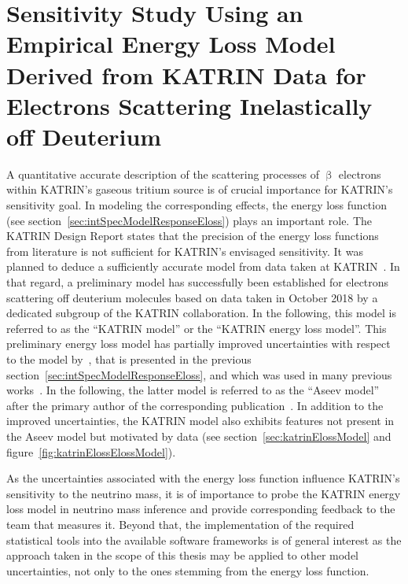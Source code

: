 \def\currentRootFolder{chapter/sensitivityStudyWithPreliminaryKatrinElossModel}
\def\currentFigureFolder{\currentRootFolder/fig}

\chapter{Sensitivity Study Using an Empirical Energy Loss Model Derived from KATRIN Data for Electrons Scattering Inelastically off Deuterium}
\label{sec:katrinEloss}
A quantitative accurate description of the scattering processes of $\upbeta$ electrons within KATRIN's gaseous tritium source is of crucial importance for KATRIN's sensitivity goal. In modeling the corresponding effects, the energy loss function (see section~\ref{sec:intSpecModelResponseEloss}) plays an important role. The KATRIN Design Report states that the precision of the energy loss functions from literature is not sufficient for KATRIN's envisaged sensitivity. It was planned to deduce a sufficiently accurate model from data taken at KATRIN~\cite{Angrik:2005ep}. In that regard, a preliminary model has successfully been established for electrons scattering off deuterium molecules based on data taken in October 2018 by a dedicated subgroup of the KATRIN collaboration. In the following, this model is referred to as the ``KATRIN model'' or the ``KATRIN energy loss model''. This preliminary energy loss model has partially improved uncertainties with respect to the model by~\cite{Aseev2000}, that is presented in the previous section~\ref{sec:intSpecModelResponseEloss}, and which was used in many previous works~\cite{Groh2015,Kleesiek2014, Kleesiek2019, SeitzM2019}. In the following, the latter model is referred to as the ``Aseev model'' after the primary author of the corresponding publication~\cite{Aseev2000}. In addition to the improved uncertainties, the KATRIN model also exhibits features not present in the Aseev model but motivated by data (see section~\ref{sec:katrinElossModel} and figure~\ref{fig:katrinElossElossModel}). 

As the uncertainties associated with the energy loss function influence KATRIN's sensitivity to the neutrino mass, it is of importance to probe the KATRIN energy loss model in neutrino mass inference and provide corresponding feedback to the team that measures it. Beyond that, the implementation of the required statistical tools into the available software frameworks is of general interest as the approach taken in the scope of this thesis may be applied to other model uncertainties, not only to the ones stemming from the energy loss function. 

